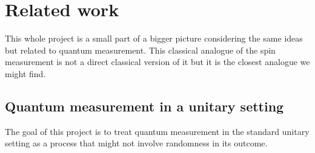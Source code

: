 \chapter{Related work}
This whole project is a small part of a bigger picture considering the same ideas but related to quantum measurement. This classical analogue of the spin measurement is not a direct classical version of it but it is the closest analogue we might find.
\section{Quantum measurement in a unitary setting}
The goal of this project is to treat quantum measurement in the standard unitary setting as a process that might not involve randomness in its outcome. 